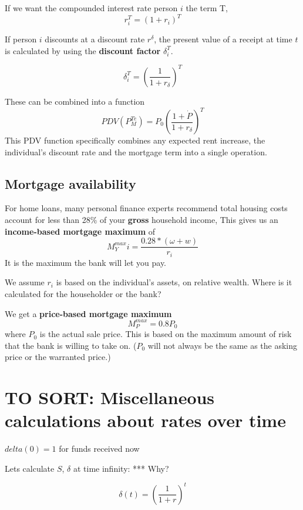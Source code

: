If we want the compounded interest rate person $i$ the term T,
\[r_i^T=(1+r_i)^T\]

If person $i$  discounts at a discount rate $r^\delta$, the present value of a receipt at time $t$ is calculated by using the \textbf{discount factor} $\delta_i^T$.

\[\delta_i^T= \left( \frac{1}{1+r_\delta} \right)^T \]
 
These can be combined into a function %
\[ PDV(P_M^{Te})=P_0\left( \frac{1+\dot P}{1+r_\delta} \right)^T \]
This PDV function specifically combines any expected rent increase, the individual's discount rate and the mortgage term into a single operation.

\subsection{Mortgage availability}
For home loans, many personal finance experts recommend total housing costs account for less than 28\% of your \textbf{gross} household income, This gives us an \textbf{income-based  mortgage maximum} of \[M^{max}_Yi = \frac{0.28*(\omega+w)}{r_i}\] It is the maximum the bank will let you pay.

We assume $r_i$ is based on the individual's assets, on relative wealth. Where is it calculated for the householder or the bank?

We get a \textbf{price-based mortgage maximum} \[M^{max}_P = 0.8P_0\] where $P_0$ is the actual sale price. This is based on the maximum amount of risk that the bank is willing to take on. ($P_0$  will not always be the same as the asking price or the warranted price.)


\section{TO SORT: Miscellaneous calculations about rates over time}


$delta(0)=1$  for funds received now

Lets calculate $S$, $\delta$ at time infinity:
*** Why?

\[\delta(t)=\left(\frac{1}{1+r}\right)^t\]



